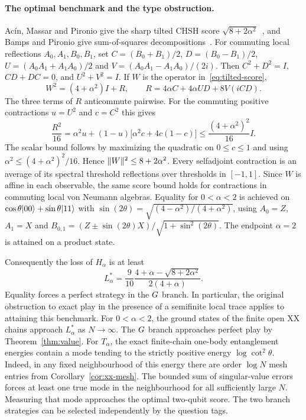 \paragraph{The optimal benchmark and the type obstruction.}
Ac\'in, Massar and Pironio give the sharp tilted CHSH score
$\sqrt{8+2\alpha^2}$~\cite{AMP12}, and Bamps and Pironio give
sum-of-squares decompositions~\cite{BP15}. For commuting local reflections
$A_0,A_1,B_0,B_1$, set $C=(B_0+B_1)/2$, $D=(B_0-B_1)/2$,
$U=(A_0A_1+A_1A_0)/2$ and $V=(A_0A_1-A_1A_0)/(2i)$.
Then $C^2+D^2=I$, $CD+DC=0$, and $U^2+V^2=I$. If $W$ is the operator
in~\eqref{eq:tilted-score},
\[
 W^2=(4+\alpha^2)I+R,\qquad R=4\alpha C+4\alpha U D+8V(iCD).
\]
The three terms of $R$ anticommute pairwise. For the commuting
positive contractions $u=U^2$ and $c=C^2$ this gives
\[
 \frac{R^2}{16}=\alpha^2u+(1-u)\bigl[\alpha^2c+4c(1-c)\bigr]
 \le \frac{(4+\alpha^2)^2}{16}I.
\]
The scalar bound follows by maximizing the quadratic on $0\le c\le1$
and using $\alpha^2\le(4+\alpha^2)^2/16$. Hence $\lVert W\rVert^2\le8+2\alpha^2$.
Every selfadjoint contraction is an average of its spectral threshold
reflections over thresholds in $[-1,1]$. Since $W$ is affine in each
observable, the same score bound holds for contractions in commuting
local von Neumann algebras. Equality for $0<\alpha<2$ is achieved on
$\cos\theta|00\rangle+\sin\theta|11\rangle$ with
$\sin(2\theta)=\sqrt{(4-\alpha^2)/(4+\alpha^2)}$, using $A_0=Z$, $A_1=X$
and $B_{0,1}=(Z\pm\sin(2\theta)X)/\sqrt{1+\sin^2(2\theta)}$.
The endpoint $\alpha=2$ is attained on a product state.

Consequently the loss of $H_\alpha$ is at least
\[
 L_\alpha^* = \frac9{10}\frac{4+\alpha-\sqrt{8+2\alpha^2}}{2(4+\alpha)}.
\]
Equality forces a perfect strategy in the $G$ branch. In particular,
the original obstruction to exact play in the presence of a semifinite
local trace applies to attaining this benchmark.
For $0<\alpha<2$, the ground states of the finite open XX chains approach
$L_\alpha^*$ as $N\to\infty$. The $G$ branch approaches perfect play
by Theorem~\ref{thm:value}. For $T_\alpha$, the exact finite-chain
one-body entanglement energies contain a mode tending to the strictly
positive energy $\log\cot^2\theta$. Indeed, in any fixed neighbourhood
of this energy there are order $\log N$ mesh entries from
Corollary~\ref{cor:xx-mesh}. The bounded sum of singular-value errors
forces at least one true mode in the neighbourhood for all sufficiently
large $N$. Measuring that mode approaches the optimal two-qubit score.
The two branch strategies can be selected independently by the question tags.
